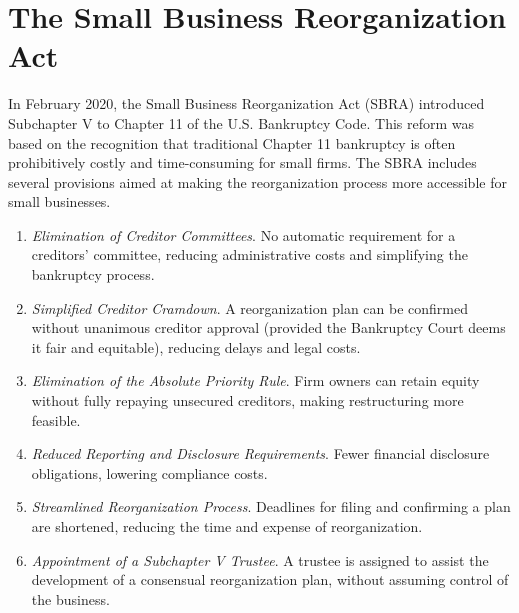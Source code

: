\documentclass[12pt]{article}
\begin{document}
\section{The Small Business Reorganization Act}
In February 2020, the Small Business Reorganization Act (SBRA) introduced Subchapter V to Chapter 11 of the U.S. Bankruptcy Code. This reform was based on the recognition that traditional Chapter 11 bankruptcy is often prohibitively costly and time-consuming for small firms. The SBRA includes several provisions aimed at making the reorganization process more accessible for small businesses.
\begin{enumerate}
    \item \textit{Elimination of Creditor Committees}. No automatic requirement for a creditors' committee, reducing administrative costs and simplifying the bankruptcy process.   
    \item \textit{Simplified Creditor Cramdown}. A reorganization plan can be confirmed without unanimous creditor approval (provided the Bankruptcy Court deems it fair and equitable), reducing delays and legal costs.
    \item \textit{Elimination of the Absolute Priority Rule}. Firm owners can retain equity without fully repaying unsecured creditors, making restructuring more feasible.
    \item \textit{Reduced Reporting and Disclosure Requirements}. Fewer financial disclosure obligations, lowering compliance costs.
    \item \textit{Streamlined Reorganization Process}. Deadlines for filing and confirming a plan are shortened, reducing the time and expense of reorganization.
    \item \textit{Appointment of a Subchapter V Trustee}. A trustee is assigned to assist the development of a consensual reorganization plan, without assuming control of the business.
\end{enumerate}
\end{document}
